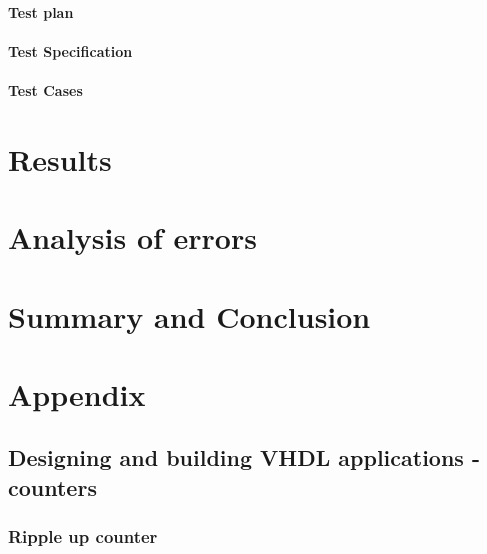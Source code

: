 \documentclass{article}
\begin{document}
  \paragraph{Test plan}

  \paragraph{Test Specification}

  \paragraph{Test Cases}

\section{Results}

\section{Analysis of errors}

\section{Summary and Conclusion}

\section{Appendix}

\subsection{Designing and building VHDL applications - counters}

\subsubsection{Ripple up counter}


\newpage
\end{document}
